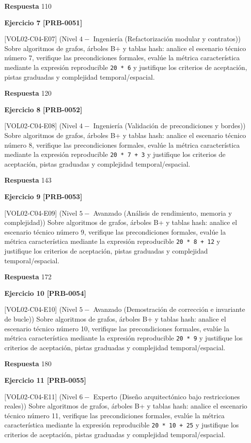 \documentclass{book}
\begin{document}
\noindent\textbf{Respuesta} 110

\noindent\textbf{Ejercicio 7 [PRB-0051]}

[VOL02-C04-E07] (Nivel \(4 -\) Ingeniería (Refactorización modular y contratos)) Sobre algoritmos de grafos, árboles B+ y tablas hash: analice el escenario técnico número 7, verifique las precondiciones formales, evalúe la métrica característica mediante la expresión reproducible \texttt{20 * 6} y justifique los criterios de aceptación, pistas graduadas y complejidad temporal/espacial.

\noindent\textbf{Respuesta} 120

\noindent\textbf{Ejercicio 8 [PRB-0052]}

[VOL02-C04-E08] (Nivel \(4 -\) Ingeniería (Validación de precondiciones y bordes)) Sobre algoritmos de grafos, árboles B+ y tablas hash: analice el escenario técnico número 8, verifique las precondiciones formales, evalúe la métrica característica mediante la expresión reproducible \texttt{20 * 7 + 3} y justifique los criterios de aceptación, pistas graduadas y complejidad temporal/espacial.

\noindent\textbf{Respuesta} 143

\noindent\textbf{Ejercicio 9 [PRB-0053]}

[VOL02-C04-E09] (Nivel \(5 -\) Avanzado (Análisis de rendimiento, memoria y complejidad)) Sobre algoritmos de grafos, árboles B+ y tablas hash: analice el escenario técnico número 9, verifique las precondiciones formales, evalúe la métrica característica mediante la expresión reproducible \texttt{20 * 8 + 12} y justifique los criterios de aceptación, pistas graduadas y complejidad temporal/espacial.

\noindent\textbf{Respuesta} 172

\noindent\textbf{Ejercicio 10 [PRB-0054]}

[VOL02-C04-E10] (Nivel \(5 -\) Avanzado (Demostración de corrección e invariante de bucle)) Sobre algoritmos de grafos, árboles B+ y tablas hash: analice el escenario técnico número 10, verifique las precondiciones formales, evalúe la métrica característica mediante la expresión reproducible \texttt{20 * 9} y justifique los criterios de aceptación, pistas graduadas y complejidad temporal/espacial.

\noindent\textbf{Respuesta} 180

\noindent\textbf{Ejercicio 11 [PRB-0055]}

[VOL02-C04-E11] (Nivel \(6 -\) Experto (Diseño arquitectónico bajo restricciones reales)) Sobre algoritmos de grafos, árboles B+ y tablas hash: analice el escenario técnico número 11, verifique las precondiciones formales, evalúe la métrica característica mediante la expresión reproducible \texttt{20 * 10 + 25} y justifique los criterios de aceptación, pistas graduadas y complejidad temporal/espacial.
\end{document}
